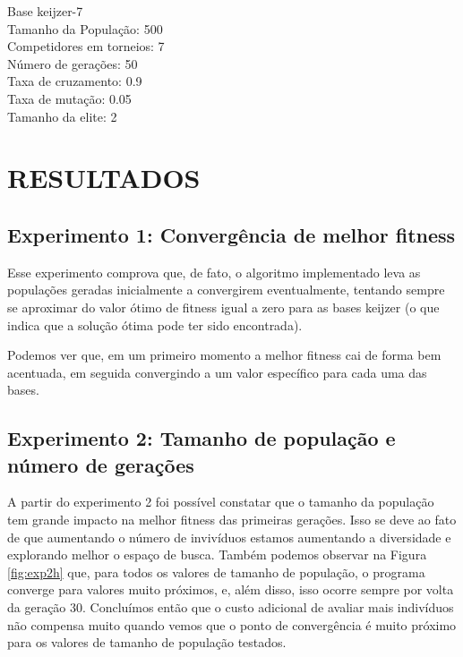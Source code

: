 \documentclass[12pt]{article}
\begin{document}
\begin{itemize}
 Base keijzer-7 \\
 Tamanho da População: 500 \\
 Competidores em torneios: 7 \\
 Número de gerações: 50 \\
 Taxa de cruzamento: 0.9 \\ 
 Taxa de mutação: 0.05 \\
 Tamanho da elite: 2 \\
 
\end{itemize}


\section{RESULTADOS} \label{sec:result}

\subsection{Experimento 1: Convergência de melhor fitness}

Esse experimento comprova que, de fato, o algoritmo implementado leva as populações
geradas inicialmente a convergirem eventualmente, tentando sempre se aproximar do valor
ótimo de fitness igual a zero para as bases keijzer (o que indica que a solução ótima
pode ter sido encontrada).
  
Podemos ver que, em um primeiro momento a melhor fitness cai de forma bem acentuada,
em seguida convergindo a um valor específico para cada uma das bases.

\subsection{Experimento 2: Tamanho de população e número de gerações}

A partir do experimento 2 foi possível constatar que o tamanho da população tem grande impacto
na melhor fitness das primeiras gerações. Isso se deve ao fato de que aumentando o número de
invivíduos estamos aumentando a diversidade e explorando melhor o espaço de busca. Também
podemos observar na Figura \ref{fig:exp2h} que, para todos os valores de tamanho de população,
o programa converge para valores muito próximos, e, além disso, isso ocorre sempre por volta da 
geração 30. Concluímos então que o custo adicional de avaliar mais indivíduos não compensa muito
quando vemos que o ponto de convergência é muito próximo para os valores de tamanho de população
testados.
\end{document}
